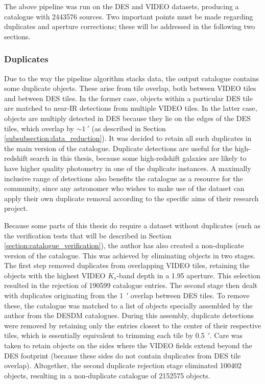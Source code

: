 The above pipeline was run on the DES and VIDEO datasets, producing a catalogue with \num{2 443 576} sources. Two important points must be made regarding duplicates and aperture corrections; these will be addressed in the following two sections.  \par

\subsubsection{Duplicates}\label{subsubsection:duplicates}
Due to the way the pipeline algorithm stacks data, the output \DESVIDEO catalogue contains some duplicate objects. These arise from tile overlap, both between VIDEO tiles and between DES tiles. In the former case, objects within a particular DES tile are matched to near-IR detections from multiple VIDEO tiles. In the latter case, objects are multiply detected in DES because they lie on the edges of the DES tiles, which overlap by $\sim\SI{1}{\arcmin}$ (as described in Section \ref{subsubsection:data_reduction}). It was decided to retain all such duplicates in the main version of the \DESVIDEO catalogue. Duplicate detections are useful for the high-redshift search in this thesis, because some high-redshift galaxies are likely to have higher quality photometry in one of the duplicate instances. A maximally inclusive range of detections also benefits the catalogue as a resource for the community, since any astronomer who wishes to make use of the dataset can apply their own duplicate removal according to the specific aims of their research project. \par 


Because some parts of this thesis do require a dataset without duplicates (such as the verification tests that will be described in Section \ref{section:catalogue_verification}), the author has also created a non-duplicate version of the \DESVIDEO catalogue. This was achieved by eliminating objects in two stages. The first step removed duplicates from overlapping VIDEO tiles, retaining the objects with the highest VIDEO $K_{s}$-band depth in a \SI{1.95}{\arcsec} aperture. This selection resulted in the rejection of \num{190 599} catalogue entries. The second stage then dealt with duplicates originating from the \SI{1}{\arcmin} overlap between DES tiles. To remove these, the \DESVIDEO catalogue was matched to a list of objects specially assembled by the author from the DESDM catalogues. During this assembly, duplicate detections were removed by retaining only the entries closest to the center of their respective tiles, which is essentially equivalent to trimming each tile by \SI{0.5}{\arcmin}. Care was taken to retain objects on the sides where the VIDEO fields extend beyond the DES footprint (because these sides do not contain duplicates from DES tile overlap). Altogether, the second duplicate rejection stage eliminated \num{100 402} \DESVIDEO objects, resulting in a non-duplicate \DESVIDEO catalogue of \num{2 152 575} objects. \par



